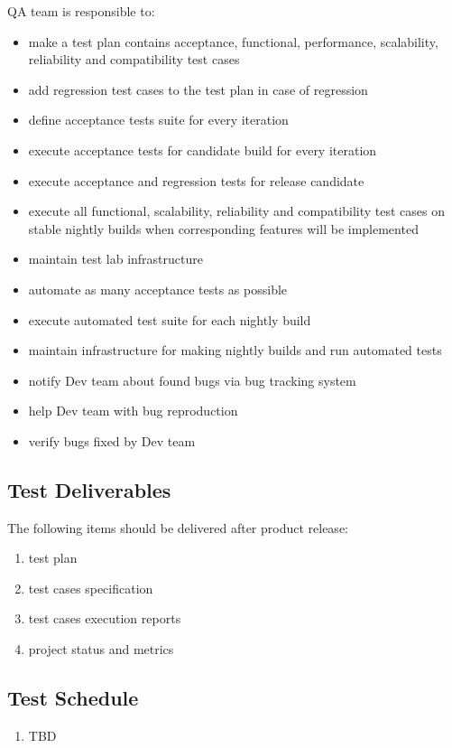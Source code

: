 \documentclass[a4paper,11pt]{article}
\begin{document}
QA team is responsible to:
\begin{itemize}
\item make a test plan contains acceptance, functional, performance, scalability, reliability and compatibility test cases
\item add regression test cases to the test plan in case of regression
\item define acceptance tests suite for every iteration
\item execute acceptance tests for candidate build for every iteration
\item execute acceptance and regression tests for release candidate
\item execute all functional, scalability, reliability and compatibility test cases on stable nightly builds when corresponding features will be implemented
\item maintain test lab infrastructure
\item automate as many acceptance tests as possible
\item execute automated test suite for each nightly build
\item maintain infrastructure for making nightly builds and run automated tests
\item notify Dev team about found bugs via bug tracking system
\item help Dev team with bug reproduction
\item verify bugs fixed by Dev team
\end{itemize}

\subsection{Test Deliverables}
The following items should be delivered after product release:
\begin{enumerate}
\item test plan
\item test cases specification
\item test cases execution reports
\item project status and metrics
\end{enumerate}

\subsection{Test Schedule}
\begin{enumerate}
\item TBD
\end{enumerate}
\end{document}
